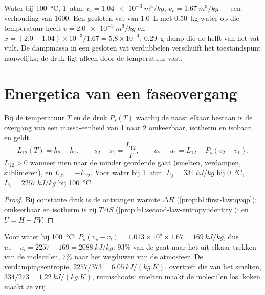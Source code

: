 \begin{example}\label{ex:b1:phase-changes:lever}
Water bij \qty{100}{\degreeCelsius}, \qty{1}{atm}: $v_l = \qty{1.04e-3}{m^3/kg}$,
$v_v = \qty{1.67}{m^3/kg}$ --- een verhouding van $1600$. Een gesloten vat van \qty{1.0}{L}
met \qty{0.50}{kg} water op die temperatuur heeft $v =
\qty{2.0e-3}{m^3/kg}$ en $x = (2.0 - 1.04) \times 10^{-3}/1.67 = 5.8 \times 10^{-4}$:
\qty{0.29}{g} damp die de helft van het vat vult. De dampmassa in een gesloten
vat verdubbelen verschuift het toestandspunt nauwelijks; de druk ligt
alleen door de temperatuur vast.
\end{example}

\section{Energetica van een faseovergang}

\begin{proposition}\label{prop:b1:phase-changes:latent}
Bij de temperatuur $T$ en de druk $P_s(T)$ waarbij de  naast elkaar bestaan is de
overgang van een massa-eenheid van  1 naar  2 omkeerbaar,
isotherm en isobaar, en geldt
\[
L_{12}(T) = h_2 - h_1 , \qquad s_2 - s_1 = \frac{L_{12}}{T} , \qquad
u_2 - u_1 = L_{12} - P_s(v_2 - v_1) .
\]
$L_{12} > 0$ wanneer men naar de minder geordende  gaat (smelten,
verdampen, sublimeren), en $L_{21} = -L_{12}$. Voor water bij \qty{1}{atm}:
$L_f = \qty{334}{kJ/kg}$ bij \qty{0}{\degreeCelsius}, $L_v = \qty{2257}{kJ/kg}$ bij
\qty{100}{\degreeCelsius}.
\end{proposition}

\begin{proof}
Bij constante druk is de ontvangen warmte $\Delta H$
(\cref{prop:b1:first-law:qvqp}); omkeerbaar en isotherm is zij
$T\Delta S$ (\cref{prop:b1:second-law-entropy:identity}); en $U = H - PV$.
\end{proof}

\begin{example}\label{ex:b1:phase-changes:whereheat}
Voor water bij \qty{100}{\degreeCelsius}: $P_s(v_v - v_l) = 1.013 \times 10^5 \times
1.67 = \qty{169}{kJ/kg}$, dus $u_v - u_l = 2257 - 169 = \qty{2088}{kJ/kg}$:
$93\%$ van de  gaat naar het uit elkaar trekken van de moleculen, $7\%$
naar het wegduwen van de atmosfeer. De verdampingsentropie,
$2257/373 = \qty{6.05}{kJ/(kg.K)}$, overtreft die van het smelten, $334/273 =
\qty{1.22}{kJ/(kg.K)}$, ruimschoots: smelten maakt de moleculen los, koken maakt ze vrij.
\end{example}


